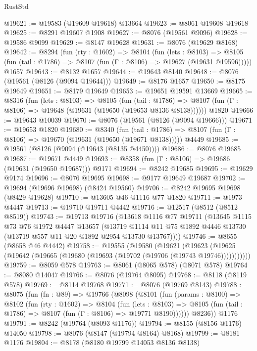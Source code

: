 \begin{lexlean}{RustStd}
\begin{coremodule}
@19621 := @19583 (@19609 @19618) @13664
@19623 := @8061 @19608 @19618
@19625 := @8291 @19607 @1908
@19627 := @8076 (@19561 @9096)
@19628 := @19586 @9099
@19629 := @8147 @19628
@19631 := @8076 (@19629 @8168)
@19642 := @8294
    (fun (rty : @1602) =>
    @8104
      (fun (lets : @8103) =>
      @8105 (fun (tail : @1786) => @8107 (fun (Γ : @8106) => @19627 (@19631 @19596)))))
    @1657
@19643 := @8132 @1657
@19644 := @19643 @8140
@19648 := @8076 (@19561 (@8126 (@9094 @19644)))
@19649 := @8176 @1657
@19650 := @8175 @19649
@19651 := @8179 @19649
@19653 := @19651 @19591 @13669
@19665 := @8316
    (fun (lets : @8103) =>
    @8105
      (fun (tail : @1786) =>
      @8107 (fun (Γ : @8106) => @19648 (@19631 (@19650 (@19653 @8136 @8138))))))
    @1820
@19666 := @19643 @10039
@19670 := @8076 (@19561 (@8126 (@9094 @19666)))
@19671 := @19653 @1820
@19680 := @8340
    (fun (tail : @1786) => @8107 (fun (Γ : @8106) => @19670 (@19631 (@19650 (@19671 @8138)))))
    @4449
@19685 := @19561 (@8126 (@9094 (@19643 (@8135 @4450))))
@19686 := @8076 @19685
@19687 := @19671 @4449
@19693 := @8358 (fun (Γ : @8106) => @19686 (@19631 (@19650 @19687))) @9171
@19694 := @8242 @19685
@19695 := @19629 @9174
@19696 := @8076 @19695
@19698 := @9177 @19649 @19687
@19702 := @19694 (@19696 @19698) (@8424 @19560)
@19706 := @8242 @19695 @19698 (@8429 @19628)
@19710 := @13605 @46 @1116 @77 @1820
@19711 := @1973 @4447
@19713 := @19710 @19711 @4442
@19716 := @12517 (@8512 (@8512 @8519))
@19743 := @19713
    @19716
    (@13618
      @1116
      @77
      @19711
      (@13645
        @1115
        @73
        @76
        @1972
        @4447
        @13657
        (@13719 @1114 @11 @75 @1892 @4446 @13730 (@13719 @557 @11 @20 @1892 @2954 @13730 @13767))))
@19746 := @8655 (@8658 @46 @4442)
@19758 := @19555
    (@19580
      (@19621
        (@19623 (@19625 (@19642 (@19665 (@19680 (@19693 (@19702 (@19706 (@19743 @19746)))))))))))
@19759 := @8059 @578
@19763 := @8061 (@8065 @578) (@8071 @578)
@19764 := @8080 @14047
@19766 := @8076 (@19764 @8095)
@19768 := @8118 (@8119 @578)
@19769 := @8114 @19768
@19771 := @8076 (@19769 @8143)
@19788 := @8075
    (fun (fn : @89) =>
    @19766
      (@8098
        (@8101
          (fun (params : @8100) =>
          @8102
            (fun (rty : @1602) =>
            @8104
              (fun (lets : @8103) =>
              @8105 (fun (tail : @1786) => @8107 (fun (Γ : @8106) => @19771 @8190))))))
        @8236))
    @1176
@19791 := @8242 (@19764 (@8093 @1176))
@19794 := @8155 (@8156 @1176) @14050
@19798 := @8076 (@8147 (@19794 @8164) @8168)
@19799 := @8181 @1176
@19804 := @8178 (@8180 @19799 @14053 @8136 @8138)

\end{coremodule}
\end{lexlean}

